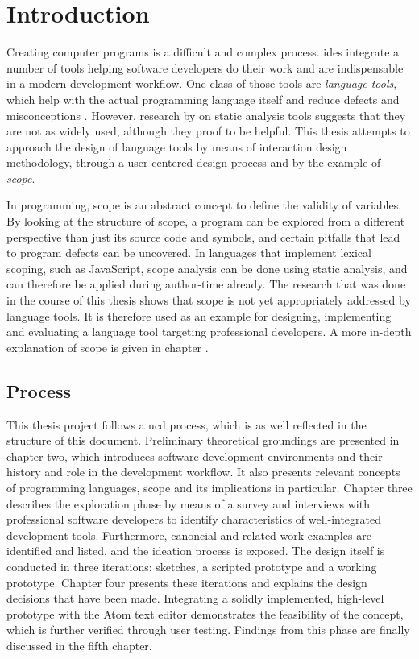 \chapter{Introduction}\label{introduction}

Creating computer programs is a difficult and complex process.
\glspl{ide} integrate a number of tools helping software developers do
their work and are indispensable in a modern development workflow. One
class of those tools are \emph{language tools}, which help with the
actual programming language itself and reduce defects and misconceptions
\cite{hidayat}. However, research by  on static
analysis tools suggests that they are not as widely used, although they
proof to be helpful. This thesis attempts to approach the design of
language tools by means of interaction design methodology, through a
user-centered design process and by the example of \emph{scope}.

In programming, scope is an abstract concept to define the validity of
variables. By looking at the structure of scope, a program can be
explored from a different perspective than just its source code and
symbols, and certain pitfalls that lead to program defects can be
uncovered. In languages that implement lexical scoping, such as
JavaScript, scope analysis can be done using static analysis, and can
therefore be applied during author-time already. The research that was
done in the course of this thesis shows that scope is not yet
appropriately addressed by language tools. It is therefore used as an
example for designing, implementing and evaluating a language tool
targeting professional developers. A more in-depth explanation of scope
is given in chapter .

\section{Process}\label{process}

This thesis project follows a \acl{ucd} process, which is as well
reflected in the structure of this document. Preliminary theoretical
groundings are presented in chapter two, which introduces software
development environments and their history and role in the development
workflow. It also presents relevant concepts of programming languages,
scope and its implications in particular. Chapter three describes the
exploration phase by means of a survey and interviews with professional
software developers to identify characteristics of well-integrated
development tools. Furthermore, canoncial and related work examples are
identified and listed, and the ideation process is exposed. The design
itself is conducted in three iterations: sketches, a scripted prototype
and a working prototype. Chapter four presents these iterations and
explains the design decisions that have been made. Integrating a solidly
implemented, high-level prototype with the Atom text editor demonstrates
the feasibility of the concept, which is further verified through user
testing. Findings from this phase are finally discussed in the fifth
chapter.

